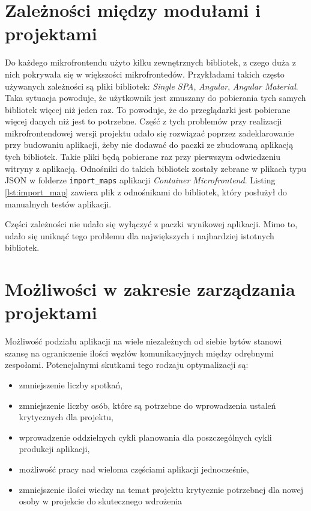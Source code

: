 \documentclass{SGGW-thesis}
\begin{document}
  \section{Zależności między modułami i projektami}
  Do każdego mikrofrontendu użyto kilku zewnętrznych bibliotek, z czego duża z nich pokrywała się w większości mikrofrontedów. Przykładami takich często używanych zależności są pliki bibliotek: \textit{Single SPA}, \textit{Angular}, \textit{Angular Material}. Taka sytuacja powoduje, że użytkownik jest zmuszany do pobierania tych samych bibliotek więcej niż jeden raz. To powoduje, że do przeglądarki jest pobierane więcej danych niż jest to potrzebne. Część z tych problemów przy realizacji mikrofrontendowej wersji projektu udało się rozwiązać poprzez zadeklarowanie przy budowaniu aplikacji, żeby nie dodawać do paczki ze zbudowaną aplikacją tych bibliotek. Takie pliki będą pobierane raz przy pierwszym odwiedzeniu witryny z aplikacją. Odnośniki do takich bibliotek zostały zebrane w plikach typu JSON w folderze \lstinline{import_maps} aplikacji \textit{Container Microfrontend}. Listing \cref{lst:import_map} zawiera plik z odnośnikami do bibliotek, który posłużył do manualnych testów aplikacji.

  

  Części zależności nie udało się wyłączyć z paczki wynikowej aplikacji. Mimo to, udało się uniknąć tego problemu dla największych i najbardziej istotnych bibliotek.

  \pagebreak

  \section{Możliwości w zakresie zarządzania projektami}
  Możliwość podziału aplikacji na wiele niezależnych od siebie bytów stanowi szansę na ograniczenie ilości węzłów komunikacyjnych między odrębnymi zespołami. Potencjalnymi skutkami tego rodzaju optymalizacji są:

  \begin{itemize}
    \item zmniejszenie liczby spotkań,
    \item zmniejszenie liczby osób, które są potrzebne do wprowadzenia ustaleń krytycznych dla projektu,
    \item wprowadzenie oddzielnych cykli planowania dla poszczególnych cykli produkcji aplikacji,
    \item możliwość pracy nad wieloma częściami aplikacji jednocześnie,
    \item zmniejszenie ilości wiedzy na temat projektu krytycznie potrzebnej dla nowej osoby w projekcie do skutecznego wdrożenia
  \end{itemize}  
\end{document}

